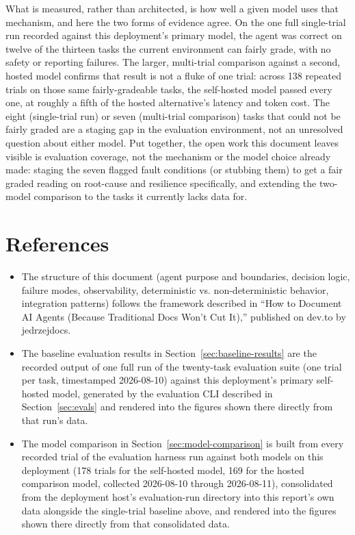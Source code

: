 \documentclass[11pt]{article}
\begin{document}
What is measured, rather than architected, is how well a given model uses
that mechanism, and here the two forms of evidence agree. On the one
full single-trial run recorded against this deployment's primary model, the
agent was correct on twelve of the thirteen tasks the current environment
can fairly grade, with no safety or reporting failures. The larger,
multi-trial comparison against a second, hosted model confirms that result
is not a fluke of one trial: across 138 repeated trials on those same
fairly-gradeable tasks, the self-hosted model passed every one, at roughly
a fifth of the hosted alternative's latency and token cost. The eight
(single-trial run) or seven (multi-trial comparison) tasks that could not
be fairly graded are a staging gap in the evaluation environment, not an
unresolved question about either model. Put together, the open work this
document leaves visible is evaluation coverage, not the mechanism or the
model choice already made: staging the seven flagged fault conditions (or
stubbing them) to get a fair graded reading on root-cause and resilience
specifically, and extending the two-model comparison to the tasks it
currently lacks data for.

\section{References}
\label{sec:references}

\begin{itemize}
  \item The structure of this document (agent purpose and boundaries,
    decision logic, failure modes, observability, deterministic vs.
    non-deterministic behavior, integration patterns) follows the framework
    described in ``How to Document AI Agents (Because Traditional Docs
    Won't Cut It),'' published on dev.to by jedrzejdocs.
  \item The baseline evaluation results in
    Section~\ref{sec:baseline-results} are the recorded output of one full
    run of the twenty-task evaluation suite (one trial per task, timestamped
    2026-08-10) against this deployment's primary self-hosted model,
    generated by the evaluation CLI described in Section~\ref{sec:evals}
    and rendered into the figures shown there directly from that run's
    data.
  \item The model comparison in Section~\ref{sec:model-comparison} is
    built from every recorded trial of the evaluation harness run against
    both models on this deployment (178 trials for the self-hosted model,
    169 for the hosted comparison model, collected 2026-08-10 through
    2026-08-11), consolidated from the deployment host's evaluation-run
    directory into this report's own data alongside the single-trial
    baseline above, and rendered into the figures shown there directly
    from that consolidated data.
\end{itemize}
\end{document}
